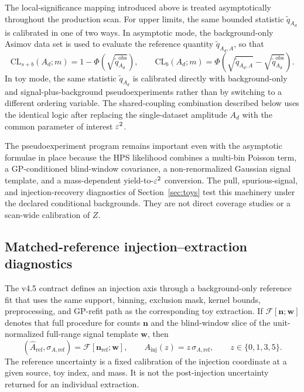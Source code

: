 The local-significance mapping introduced above is treated asymptotically throughout
the production scan. For upper limits, the same bounded statistic
$\tilde q_{A_d}$ is calibrated in one of two ways. In asymptotic mode, the
background-only Asimov data set is used to evaluate the reference quantity
$\tilde q_{A_d,A}$, so that
\begin{equation}
\mathrm{CL}_{s+b}(A_d;m)
=
1-\Phi\!\left(\sqrt{\tilde q_{A_d}^{\mathrm{obs}}}\right),
\qquad
\mathrm{CL}_{b}(A_d;m)
=
\Phi\!\left(
\sqrt{\tilde q_{A_d,A}}-\sqrt{\tilde q_{A_d}^{\mathrm{obs}}}
\right).
\label{eq:cls-asymptotic}
\end{equation}
In toy mode, the same statistic $\tilde q_{A_d}$ is calibrated directly with
background-only and signal-plus-background pseudoexperiments rather than by switching
to a different ordering variable. The shared-coupling combination described below uses
the identical logic after replacing the single-dataset amplitude $A_d$ with the common
parameter of interest $\varepsilon^2$.

The pseudoexperiment program remains important even with the asymptotic formulae in
place because the HPS likelihood combines a multi-bin Poisson term, a GP-conditioned
blind-window covariance, a non-renormalized Gaussian signal template, and a
mass-dependent yield-to-$\varepsilon^2$ conversion. The pull, spurious-signal, and
injection-recovery diagnostics of Section~\ref{sec:toys} test this machinery under the
declared conditional backgrounds. They are not direct \CLs{} coverage studies or a
scan-wide calibration of $Z$.

\subsection{Matched-reference injection--extraction diagnostics}
\label{sec:matched-reference-diagnostics}

The v4.5 contract defines an injection axis through a background-only reference fit
that uses the same support, binning, exclusion mask, kernel bounds, preprocessing, and
GP-refit path as the corresponding toy extraction.  If
$\mathcal{F}[\bm n;\bm w]$ denotes that full procedure for counts $\bm n$ and the
blind-window slice of the unit-normalized full-range signal template $\bm w$, then
\begin{equation}
(\widehat A_{\mathrm{ref}},\sigma_{A,\mathrm{ref}})
=\mathcal{F}[\bm n_{\mathrm{ref}};\bm w],
\qquad
A_{\mathrm{inj}}(z)=z\,\sigma_{A,\mathrm{ref}},
\qquad z\in\{0,1,3,5\}.
\label{eq:v4p9-matched-reference-axis}
\end{equation}
The reference uncertainty is a fixed calibration of the injection coordinate at a
given source, toy index, and mass.  It is not the post-injection uncertainty returned
for an individual extraction.

